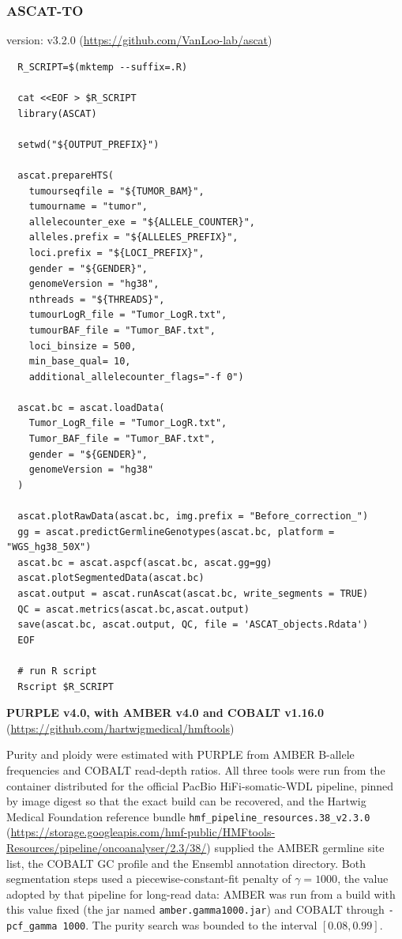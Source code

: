 \documentclass[pdflatex,sn-nature]{sn-jnl}
\begin{document}
\subsubsection{ASCAT-TO}
version: v3.2.0 (\url{https://github.com/VanLoo-lab/ascat})
\label{supp:ascat-to}
\begin{verbatim}
  R_SCRIPT=$(mktemp --suffix=.R)

  cat <<EOF > $R_SCRIPT
  library(ASCAT)

  setwd("${OUTPUT_PREFIX}")

  ascat.prepareHTS(
    tumourseqfile = "${TUMOR_BAM}",
    tumourname = "tumor",
    allelecounter_exe = "${ALLELE_COUNTER}",
    alleles.prefix = "${ALLELES_PREFIX}",
    loci.prefix = "${LOCI_PREFIX}",
    gender = "${GENDER}",
    genomeVersion = "hg38",
    nthreads = "${THREADS}",
    tumourLogR_file = "Tumor_LogR.txt",
    tumourBAF_file = "Tumor_BAF.txt",
    loci_binsize = 500,
    min_base_qual= 10,
    additional_allelecounter_flags="-f 0")

  ascat.bc = ascat.loadData(
    Tumor_LogR_file = "Tumor_LogR.txt",
    Tumor_BAF_file = "Tumor_BAF.txt",
    gender = "${GENDER}",
    genomeVersion = "hg38"
  )

  ascat.plotRawData(ascat.bc, img.prefix = "Before_correction_")
  gg = ascat.predictGermlineGenotypes(ascat.bc, platform = "WGS_hg38_50X")
  ascat.bc = ascat.aspcf(ascat.bc, ascat.gg=gg)
  ascat.plotSegmentedData(ascat.bc)
  ascat.output = ascat.runAscat(ascat.bc, write_segments = TRUE)
  QC = ascat.metrics(ascat.bc,ascat.output)
  save(ascat.bc, ascat.output, QC, file = 'ASCAT_objects.Rdata')
  EOF

  # run R script
  Rscript $R_SCRIPT
\end{verbatim}

\noindent\textbf{PURPLE v4.0, with AMBER v4.0 and COBALT v1.16.0} (\url{https://github.com/hartwigmedical/hmftools})
\label{supp:purple}

Purity and ploidy were estimated with PURPLE from AMBER B-allele frequencies and COBALT read-depth ratios. All three tools were run from the container distributed for the official PacBio HiFi-somatic-WDL pipeline, pinned by image digest so that the exact build can be recovered, and the Hartwig Medical Foundation reference bundle \texttt{hmf\_pipeline\_resources.38\_v2.3.0} (\url{https://storage.googleapis.com/hmf-public/HMFtools-Resources/pipeline/oncoanalyser/2.3/38/}) supplied the AMBER germline site list, the COBALT GC profile and the Ensembl annotation directory. Both segmentation steps used a piecewise-constant-fit penalty of $\gamma=1000$, the value adopted by that pipeline for long-read data: AMBER was run from a build with this value fixed (the jar named \texttt{amber.gamma1000.jar}) and COBALT through \texttt{-pcf\_gamma 1000}. The purity search was bounded to the interval $[0.08, 0.99]$.
\end{document}
